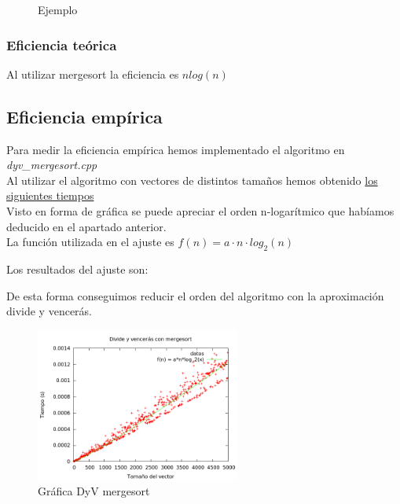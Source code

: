 \begin{figure}[h] 
\centering
	\caption{Ejemplo} 
\end{figure}

\subsubsection{Eficiencia teórica}
Al utilizar mergesort la eficiencia es $nlog(n)$

\subsection{Eficiencia empírica}
Para medir la eficiencia empírica hemos implementado el algoritmo en \textit{dyv\_mergesort.cpp}\\

Al utilizar el algoritmo con vectores de distintos tamaños hemos obtenido \hyperref[tabla_comp]{los siguientes tiempos}\\

Visto en forma de gráfica se puede apreciar el orden n-logarítmico que habíamos deducido en el apartado anterior.\\

La función utilizada en el ajuste es $f(n) = a \cdot n \cdot log_2(n)$

Los resultados del ajuste son:\\

\begin{center}
\end{center}

De esta forma conseguimos reducir el orden del algoritmo con la aproximación divide y vencerás.

\begin{figure}[h] 
\centering
	\includegraphics[width=0.6\textwidth]{../Opcional/Graficas/dyv_mergesort_bruno.png}
	\caption{Gráfica DyV mergesort} 
	\label{fig:perros} 
\end{figure}
\newpage


